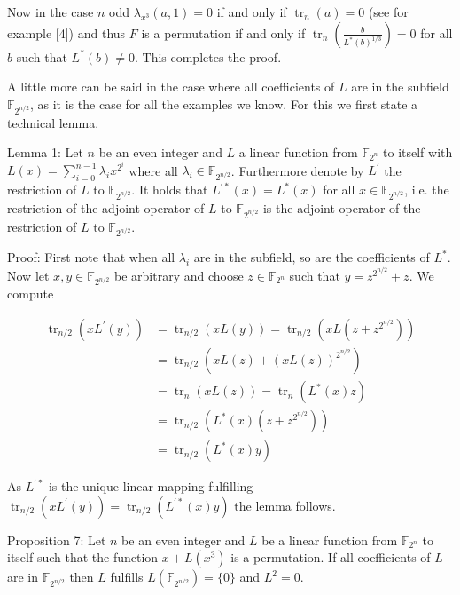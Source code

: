 \documentclass[10pt]{article}
\begin{document}
Now in the case $n$ odd $\lambda_{x^{3}}(a, 1)=0$ if and only if $\operatorname{tr}_{n}(a)=0$ (see for example [4]) and thus $F$ is a permutation if and only if $\operatorname{tr}_{n}\left(\frac{b}{L^{*}(b)^{1 / 3}}\right)=0$ for all $b$ such that $L^{*}(b) \neq 0$. This completes the proof.

A little more can be said in the case where all coefficients of $L$ are in the subfield $\mathbb{F}_{2^{n / 2}}$, as it is the case for all the examples we know. For this we first state a technical lemma.

Lemma 1: Let $n$ be an even integer and $L$ a linear function from $\mathbb{F}_{2^{n}}$ to itself with $L(x)=\sum_{i=0}^{n-1} \lambda_{i} x^{2^{i}}$ where all $\lambda_{i} \in \mathbb{F}_{2^{n / 2}}$. Furthermore denote by $L^{\prime}$ the restriction of $L$ to $\mathbb{F}_{2^{n / 2}}$. It holds that $L^{\prime *}(x)=L^{*}(x)$ for all $x \in \mathbb{F}_{2^{n / 2}}$, i.e. the restriction of the adjoint operator of $L$ to $\mathbb{F}_{2^{n / 2}}$ is the adjoint operator of the restriction of $L$ to $\mathbb{F}_{2^{n / 2}}$.

Proof: First note that when all $\lambda_{i}$ are in the subfield, so are the coefficients of $L^{*}$. Now let $x, y \in \mathbb{F}_{2^{n / 2}}$ be arbitrary and choose $z \in \mathbb{F}_{2^{n}}$ such that $y=z^{2^{n / 2}}+z$. We compute

$$
\begin{aligned}
\operatorname{tr}_{n / 2}\left(x L^{\prime}(y)\right) & =\operatorname{tr}_{n / 2}(x L(y))=\operatorname{tr}_{n / 2}\left(x L\left(z+z^{2^{n / 2}}\right)\right) \\
& =\operatorname{tr}_{n / 2}\left(x L(z)+(x L(z))^{2^{n / 2}}\right) \\
& =\operatorname{tr}_{n}(x L(z))=\operatorname{tr}_{n}\left(L^{*}(x) z\right) \\
& =\operatorname{tr}_{n / 2}\left(L^{*}(x)\left(z+z^{2^{n / 2}}\right)\right) \\
& =\operatorname{tr}_{n / 2}\left(L^{*}(x) y\right)
\end{aligned}
$$

As $L^{\prime *}$ is the unique linear mapping fulfilling $\operatorname{tr}_{n / 2}\left(x L^{\prime}(y)\right)= \operatorname{tr}_{n / 2}\left(L^{\prime *}(x) y\right)$ the lemma follows.

Proposition 7: Let $n$ be an even integer and $L$ be a linear function from $\mathbb{F}_{2^{n}}$ to itself such that the function $x+L\left(x^{3}\right)$ is a permutation. If all coefficients of $L$ are in $\mathbb{F}_{2^{n / 2}}$ then $L$ fulfills $L\left(\mathbb{F}_{2^{n / 2}}\right)=\{0\}$ and $L^{2}=0$.
\end{document}
